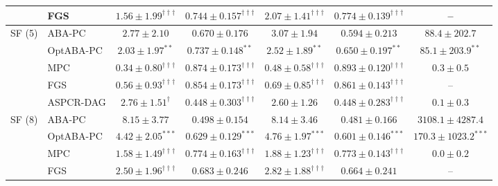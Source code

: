 \begin{table}[t]
\begin{tabular}{llccccc}
 & FGS & $\mathbf{1.56\pm1.99}^{\dagger\dagger\dagger}$ & $\mathbf{0.744\pm0.157}^{\dagger\dagger\dagger}$ & $\mathbf{2.07\pm1.41}^{\dagger\dagger\dagger}$ & $\mathbf{0.774\pm0.139}^{\dagger\dagger\dagger}$ & --\\
\midrule
SF (5) & ABA-PC & $2.77\pm2.10$ & $0.670\pm0.176$ & $3.07\pm1.94$ & $0.594\pm0.213$ & $88.4\pm202.7$\\
 & OptABA-PC & $\mathbf{2.03\pm1.97}^{**}$ & $\mathbf{0.737\pm0.148}^{**}$ & $\mathbf{2.52\pm1.89}^{**}$ & $\mathbf{0.650\pm0.197}^{**}$ & $\mathbf{85.1\pm203.9}^{**}$\\
 & MPC & $\mathbf{0.34\pm0.80}^{\dagger\dagger\dagger}$ & $\mathbf{0.874\pm0.173}^{\dagger\dagger\dagger}$ & $\mathbf{0.48\pm0.58}^{\dagger\dagger\dagger}$ & $\mathbf{0.893\pm0.120}^{\dagger\dagger\dagger}$ & $0.3\pm0.5$\\
 & FGS & $\mathbf{0.56\pm0.93}^{\dagger\dagger\dagger}$ & $\mathbf{0.854\pm0.173}^{\dagger\dagger\dagger}$ & $\mathbf{0.69\pm0.85}^{\dagger\dagger\dagger}$ & $\mathbf{0.861\pm0.143}^{\dagger\dagger\dagger}$ & --\\
 & ASPCR-DAG & $2.76\pm1.51^{\dagger}$ & $0.448\pm0.303^{\dagger\dagger\dagger}$ & $2.60\pm1.26$ & $0.448\pm0.283^{\dagger\dagger\dagger}$ & $0.1\pm0.3$\\
\midrule
SF (8) & ABA-PC & $8.15\pm3.77$ & $0.498\pm0.154$ & $8.14\pm3.46$ & $0.481\pm0.166$ & $3108.1\pm4287.4$\\
 & OptABA-PC & $\mathbf{4.42\pm2.05}^{***}$ & $\mathbf{0.629\pm0.129}^{***}$ & $\mathbf{4.76\pm1.97}^{***}$ & $\mathbf{0.601\pm0.146}^{***}$ & $\mathbf{170.3\pm1023.2}^{***}$\\
 & MPC & $\mathbf{1.58\pm1.49}^{\dagger\dagger\dagger}$ & $\mathbf{0.774\pm0.163}^{\dagger\dagger\dagger}$ & $\mathbf{1.88\pm1.23}^{\dagger\dagger\dagger}$ & $\mathbf{0.773\pm0.143}^{\dagger\dagger\dagger}$ & $0.0\pm0.2$\\
 & FGS & $\mathbf{2.50\pm1.96}^{\dagger\dagger\dagger}$ & $0.683\pm0.246$ & $\mathbf{2.82\pm1.88}^{\dagger\dagger\dagger}$ & $0.664\pm0.241$ & --\\
\bottomrule
\end{tabular}

\end{table}

